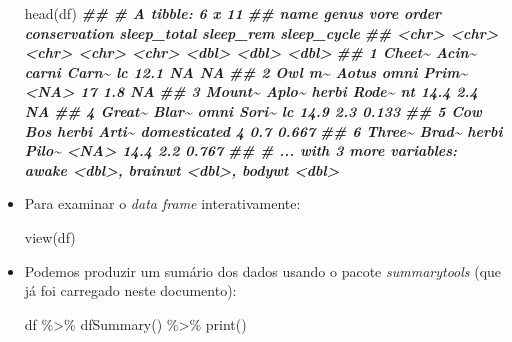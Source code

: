 \documentclass[
  11pt]{report}
\newenvironment{Shaded}{\begin{snugshade}}{\end{snugshade}}
\newcommand{\DocumentationTok}[1]{\textcolor[rgb]{0.56,0.35,0.01}{\textbf{\textit{#1}}}}
\newcommand{\FunctionTok}[1]{\textcolor[rgb]{0.00,0.00,0.00}{#1}}
\newcommand{\NormalTok}[1]{#1}
\newcommand{\SpecialCharTok}[1]{\textcolor[rgb]{0.00,0.00,0.00}{#1}}
\begin{document}
\begin{itemize}
\begin{Shaded}
\begin{Highlighting}[]
\FunctionTok{head}\NormalTok{(df)}
\DocumentationTok{\#\# \# A tibble: 6 x 11}
\DocumentationTok{\#\#   name   genus vore  order conservation sleep\_total sleep\_rem sleep\_cycle}
\DocumentationTok{\#\#   \textless{}chr\textgreater{}  \textless{}chr\textgreater{} \textless{}chr\textgreater{} \textless{}chr\textgreater{} \textless{}chr\textgreater{}              \textless{}dbl\textgreater{}     \textless{}dbl\textgreater{}       \textless{}dbl\textgreater{}}
\DocumentationTok{\#\# 1 Cheet\textasciitilde{} Acin\textasciitilde{} carni Carn\textasciitilde{} lc                  12.1      NA        NA    }
\DocumentationTok{\#\# 2 Owl m\textasciitilde{} Aotus omni  Prim\textasciitilde{} \textless{}NA\textgreater{}                17         1.8      NA    }
\DocumentationTok{\#\# 3 Mount\textasciitilde{} Aplo\textasciitilde{} herbi Rode\textasciitilde{} nt                  14.4       2.4      NA    }
\DocumentationTok{\#\# 4 Great\textasciitilde{} Blar\textasciitilde{} omni  Sori\textasciitilde{} lc                  14.9       2.3       0.133}
\DocumentationTok{\#\# 5 Cow    Bos   herbi Arti\textasciitilde{} domesticated         4         0.7       0.667}
\DocumentationTok{\#\# 6 Three\textasciitilde{} Brad\textasciitilde{} herbi Pilo\textasciitilde{} \textless{}NA\textgreater{}                14.4       2.2       0.767}
\DocumentationTok{\#\# \# ... with 3 more variables: awake \textless{}dbl\textgreater{}, brainwt \textless{}dbl\textgreater{}, bodywt \textless{}dbl\textgreater{}}
\end{Highlighting}
\end{Shaded}
\item
  Para examinar o \emph{data frame} interativamente:

\begin{Shaded}
\begin{Highlighting}[]
\FunctionTok{view}\NormalTok{(df)}
\end{Highlighting}
\end{Shaded}
\item
  Podemos produzir um sumário dos dados usando o pacote \emph{summarytools} (que já foi carregado neste documento):

\begin{Shaded}
\begin{Highlighting}[]
\NormalTok{df }\SpecialCharTok{\%\textgreater{}\%} \FunctionTok{dfSummary}\NormalTok{() }\SpecialCharTok{\%\textgreater{}\%} \FunctionTok{print}\NormalTok{()}
\end{Highlighting}
\end{Shaded}


\end{itemize}
\end{document}
